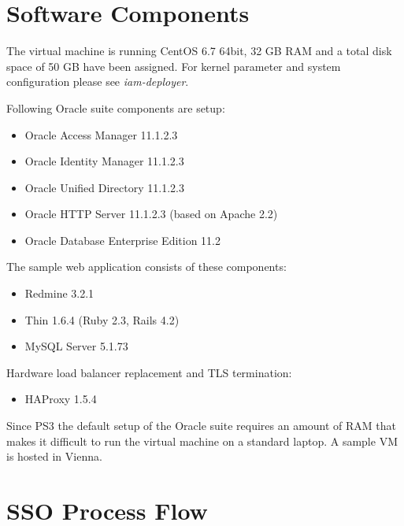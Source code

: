 \documentclass[11pt]{report}
\begin{document}
\section{Software Components}

The virtual machine is running CentOS 6.7 64bit, 32 GB RAM and a total
disk space of 50 GB have been assigned.  For kernel parameter and system
configuration please see \emph{iam-deployer}.

Following Oracle suite components are setup:

\begin{itemize}

    \item Oracle Access Manager 11.1.2.3
    \item Oracle Identity Manager 11.1.2.3
    \item Oracle Unified Directory 11.1.2.3
    \item Oracle HTTP Server 11.1.2.3 (based on Apache 2.2) 
    \item Oracle Database Enterprise Edition 11.2

\end{itemize}

The sample web application consists of these components:

\begin{itemize}

    \item Redmine 3.2.1
    \item Thin 1.6.4 (Ruby 2.3, Rails 4.2)
    \item MySQL Server 5.1.73

\end{itemize}

Hardware load balancer replacement and TLS termination:

\begin{itemize}

    \item HAProxy 1.5.4

\end{itemize}


Since PS3 the default setup of the Oracle suite requires an amount of RAM that
makes it difficult to run the virtual machine on a standard laptop.  A
sample VM is hosted in Vienna.



\section{SSO Process Flow}
\end{document}
